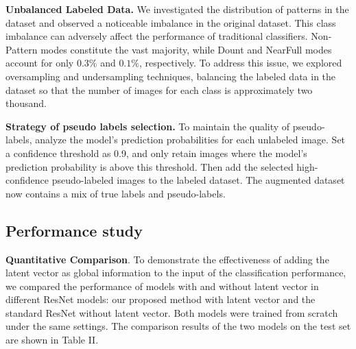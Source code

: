 \documentclass[conference]{IEEEtran}
\begin{document}
\noindent\textbf{Unbalanced Labeled Data.} We investigated the distribution of patterns in the dataset and observed a noticeable imbalance in the original dataset. This class imbalance can adversely affect the performance of traditional classifiers. Non-Pattern modes constitute the vast majority, while Dount and NearFull modes account for only $0.3\%$ and $0.1\%$, respectively. To address this issue, we explored oversampling and undersampling techniques, balancing the labeled data in the dataset so that the number of images for each class is approximately two thousand.

\noindent\textbf{Strategy of pseudo labels selection.} 
To maintain the quality of pseudo-labels, analyze the model's prediction probabilities for each unlabeled image. Set a confidence threshold as 0.9, and only retain images where the model's prediction probability is above this threshold. Then add the selected high-confidence pseudo-labeled images to the labeled dataset. The augmented dataset now contains a mix of true labels and pseudo-labels.





\subsection{Performance study}


\noindent\textbf{Quantitative Comparison}. To demonstrate the effectiveness of adding the latent vector as global information to the input of the classification performance, we compared the performance of models with and without latent vector in different ResNet models: our proposed method with latent vector and the standard ResNet without latent vector. Both models were trained from scratch under the same settings. The comparison results of the two models on the test set are shown in Table II.


\end{document}
